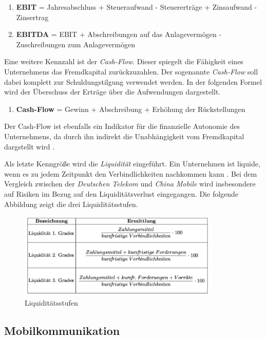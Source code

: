 \begin{enumerate}
\item \textbf{EBIT} = Jahresabschluss + Steueraufwand - Steuererträge + Zinsaufwand - Zinsertrag
\item \textbf{EBITDA} = EBIT + Abschreibungen auf das Anlagevermögen - Zuschreibungen zum Anlagevermögen 
\end{enumerate}  

Eine weitere Kennzahl ist der \textit{Cash-Flow}. Dieser spiegelt die Fähigkeit eines Unternehmens das Fremdkapital zurückzuzahlen. Der sogenannte \textit{Cash-Flow} soll dabei komplett zur Schuldungstilgung verwendet werden. In der folgenden Formel wird der Überschuss der Erträge über die Aufwendungen dargestellt.

\begin{enumerate}
\item \textbf{Cash-Flow} = Gewinn + Abschreibung + Erhöhung der Rückstellungen 
\end{enumerate}

Der Cash-Flow ist ebenfalls ein Indikator für die finanzielle Autonomie des Unternehmens, da durch ihn indirekt die Unabhängigkeit vom Fremdkapital dargstellt wird \cite{muller}.

Als letzte Kenngröße wird die \textit{Liquidität} eingeführt. Ein Unternehmen ist liquide, wenn es zu jedem Zeitpunkt den Verbindlichkeiten nachkommen kann \cite{muller}. Bei dem Vergleich zwischen der \textit{Deutschen Telekom} und \textit{China Mobile} wird insbesondere auf Risiken im Bezug auf den Liquiditätsverlust eingegangen. Die folgende Abbildung zeigt die drei Liquiditätsstufen.

\begin{figure}[H]
\centering
\includegraphics[width=0.85\textwidth]{pictures/liquidity.png}
\caption{Liquiditätsstufen}
\label{fig:liquidity}
\end{figure}

\subsection{Mobilkommunikation}

